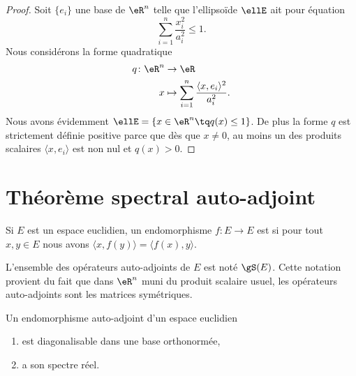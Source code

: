 \begin{proof}
    Soit \( \{ e_i \}\) une base de \( \eR^n\) telle que l'ellipsoïde \( \ellE\) ait pour équation
    \begin{equation}
        \sum_{i=1}^n\frac{ x_i^2 }{ a_i^2 }\leq 1.
    \end{equation}
    Nous considérons la forme quadratique
    \begin{equation}
        \begin{aligned}
            q\colon \eR^n&\to \eR \\
            x&\mapsto \sum_{i=1}^n\frac{ \langle x, e_i\rangle^2 }{ a_i^2 }.
        \end{aligned}
    \end{equation}
    Nous avons évidemment \( \ellE=\{ x\in \eR^n\tq q(x)\leq 1 \}\). De plus la forme \( q\) est strictement définie positive parce que dès que \( x\neq 0\), au moins un des produits scalaires \( \langle x, e_i\rangle \) est non nul et \( q(x)> 0\).
\end{proof}

\section{Théorème spectral auto-adjoint}

\begin{definition}      \label{DEFooYNEQooGQgbCf}
    Si \( E\) est un espace euclidien, un endomorphisme \( f\colon E\to E\) est  si pour tout \( x,y\in E\) nous avons \( \langle x, f(y)\rangle=\langle f(x), y\rangle  \).
\end{definition}
L'ensemble des opérateurs auto-adjoints de \( E\) est noté \( \gS(E)\). Cette notation provient du fait que dans \( \eR^n\) muni du produit scalaire usuel, les opérateurs auto-adjoints sont les matrices symétriques.

\begin{theorem} \label{ThoRSBahHH}
    Un endomorphisme auto-adjoint d'un espace euclidien
    \begin{enumerate}
        \item
            est diagonalisable dans une base orthonormée,
        \item
            a son spectre réel.
    \end{enumerate}
\end{theorem}

